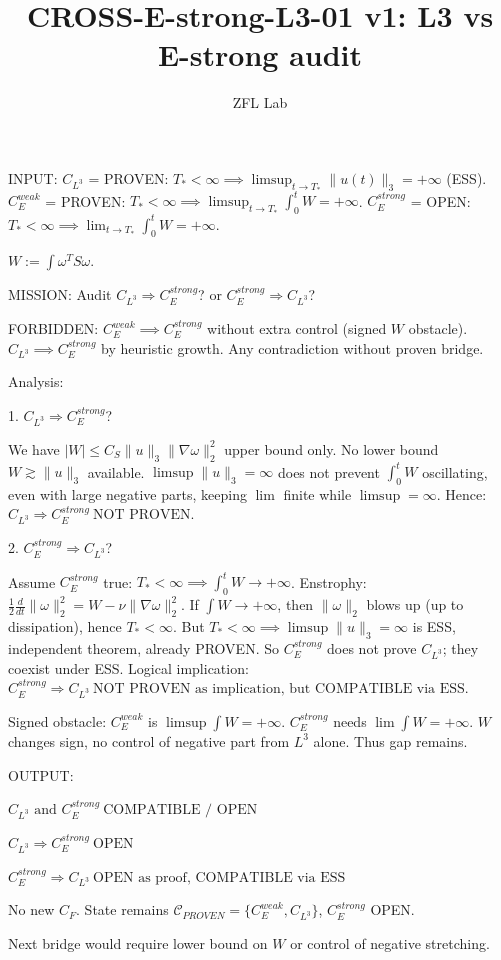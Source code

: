 \documentclass[11pt]{article}
\title{CROSS-E-strong-L3-01 v1: L3 vs E-strong audit}
\author{ZFL Lab}
\begin{document}
\maketitle

INPUT:
$C_{L^3}$ = PROVEN: $T_*<\infty \implies \limsup_{t\to T_*}\|u(t)\|_3=+\infty$ (ESS).
$C_E^{weak}$ = PROVEN: $T_*<\infty \implies \limsup_{t\to T_*}\int_0^t W = +\infty$.
$C_E^{strong}$ = OPEN: $T_*<\infty \implies \lim_{t\to T_*}\int_0^t W = +\infty$.

$W:=\int \omega^T S \omega$.

MISSION: Audit $C_{L^3}\Rightarrow C_E^{strong}$? or $C_E^{strong}\Rightarrow C_{L^3}$?

FORBIDDEN:
$C_E^{weak}\implies C_E^{strong}$ without extra control (signed $W$ obstacle).
$C_{L^3}\implies C_E^{strong}$ by heuristic growth.
Any contradiction without proven bridge.

Analysis:

1. $C_{L^3}\Rightarrow C_E^{strong}$?

We have $|W|\le C_S\|u\|_3\|\nabla\omega\|_2^2$ upper bound only.
No lower bound $W\gtrsim \|u\|_3$ available.
$\limsup\|u\|_3=\infty$ does not prevent $\int_0^t W$ oscillating, even with large negative parts, keeping $\lim$ finite while $\limsup=\infty$.
Hence:
$\boxed{C_{L^3}\Rightarrow C_E^{strong}\ \text{NOT PROVEN}}$.

2. $C_E^{strong}\Rightarrow C_{L^3}$?

Assume $C_E^{strong}$ true: $T_*<\infty\implies \int_0^tW\to+\infty$.
Enstrophy: $\frac12\frac{d}{dt}\|\omega\|_2^2 = W-\nu\|\nabla\omega\|_2^2$.
If $\int W\to+\infty$, then $\|\omega\|_2$ blows up (up to dissipation), hence $T_*<\infty$.
But $T_*<\infty\implies\limsup\|u\|_3=\infty$ is ESS, independent theorem, already PROVEN.
So $C_E^{strong}$ does not prove $C_{L^3}$; they coexist under ESS. Logical implication:
$\boxed{C_E^{strong}\Rightarrow C_{L^3}\ \text{NOT PROVEN as implication, but COMPATIBLE via ESS}}$.

Signed obstacle:
$C_E^{weak}$ is $\limsup\int W=+\infty$.
$C_E^{strong}$ needs $\lim\int W=+\infty$.
$W$ changes sign, no control of negative part from $L^3$ alone.
Thus gap remains.

OUTPUT:

$\boxed{C_{L^3}\text{ and }C_E^{strong}\ \text{COMPATIBLE / OPEN}}$

$\boxed{C_{L^3}\Rightarrow C_E^{strong}\ \text{OPEN}}$

$\boxed{C_E^{strong}\Rightarrow C_{L^3}\ \text{OPEN as proof, COMPATIBLE via ESS}}$

No new $C_F$. State remains $\mathcal{C}_{PROVEN}=\{C_E^{weak},C_{L^3}\}$, $C_E^{strong}$ OPEN.

Next bridge would require lower bound on $W$ or control of negative stretching.
\end{document}
